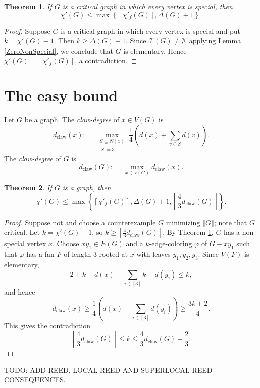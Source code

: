 \documentclass[12pt]{amsart}
\theoremstyle{plain}
\newtheorem{thm}{Theorem}
\theoremstyle{definition}
\theoremstyle{remark}
\newcommand{\fancy}[1]{\mathcal{#1}}
\newcommand{\T}{\fancy{T}}
\newcommand{\set}[1]{\left\{ #1 \right\}}
\newcommand{\card}[1]{\left|#1\right|}
\newcommand{\size}[1]{\left\Vert#1\right\Vert}
\newcommand{\ceil}[1]{\left\lceil#1\right\rceil}
\newcommand{\irange}[1]{\left[#1\right]}
\newcommand{\parens}[1]{\left( #1 \right)}
\newcommand{\DefinedAs}{\mathrel{\mathop:}=}
\newcommand{\dclaw}[1]{d_{\text{claw}}\left( #1 \right)}
\newcommand{\vph}{\varphi}
\begin{document}
\begin{thm}\label{AllSpecialImpliesElementary}
If $G$ is a critical graph in which every vertex is special, then
\[\chi'(G) \le \max \set{\ceil{\chi'_f(G)}, \Delta(G) + 1}.\]
\end{thm}
\begin{proof}
Suppose $G$ is a critical graph in which every vertex is special and put $k = \chi'(G) - 1$.  Then $k \ge \Delta(G) + 1$.
Since $\T(G) \ne \emptyset$, applying Lemma \ref{ZeroNonSpecial}, we conclude that $G$ is elementary.  Hence $\chi'(G) = \ceil{\chi'_f(G)}$, a contradiction.
\end{proof}

\section{The easy bound}
Let $G$ be a graph.  The \emph{claw-degree} of $x \in V(G)$ is 
\[\dclaw{x} \DefinedAs \max_{\substack{S \subseteq N(x) \\ \card{S} = 3}}\frac14 \parens{d(x) + \sum_{v \in S} d(v)}.\]
The \emph{claw-degree} of $G$ is 
\[\dclaw{G} \DefinedAs \max_{x \in V(G)} \dclaw{x}.\]
\begin{thm}\label{EasyBound}
If $G$ is a graph, then
\[\chi'(G) \le \max\set{\ceil{\chi'_f(G)}, \Delta(G) + 1, \ceil{\frac43\dclaw{G}}}.\]
\end{thm}
\begin{proof}
Suppose not and choose a counterexample $G$ minimizing $\size{G}$; note that $G$ critical. 
Let $k=\chi'(G)-1$, so $k \ge \ceil{\frac43\dclaw{G}}$. 
By Theorem \ref{AllSpecialImpliesElementary}, $G$ has a non-special vertex $x$.
Choose $xy_1 \in E(G)$ and a $k$-edge-coloring $\vph$ of $G - xy_1$ such that
$\vph$ has a fan $F$ of length $3$ rooted at $x$ with leaves $y_1, y_2, y_3$.  
Since $V(F)$ is elementary, 
\[2 + k - d(x) + \sum_{i \in \irange{3}} k-d(y_i) \le k,\]
and hence
\[\dclaw{x} \ge \frac14\parens{d(x) + \sum_{i \in \irange{3}} d(y_i)} \ge \frac{3k+2}{4}.\]
This gives the contradiction
\[\ceil{\frac43\dclaw{G}} \le k \le \frac43\dclaw{G} - \frac23.\]
\end{proof}

TODO: ADD REED, LOCAL REED AND SUPERLOCAL REED CONSEQUENCES.
\end{document}
